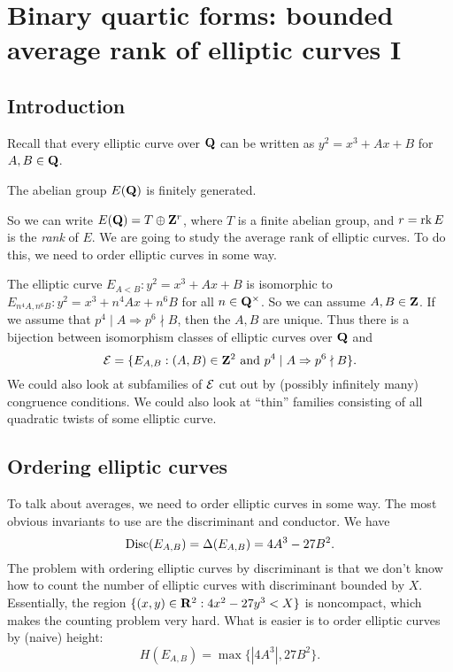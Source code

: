 
\section{Binary quartic forms: bounded average rank of elliptic curves I}\label{sec:shankar-i}





\subsection{Introduction}

Recall that every elliptic curve over $\mathbf{Q}$ can be written as 
$y^2=x^3+A x+B$ for $A,B\in \mathbf{Q}$. 

\begin{theo}[Mordell]
The abelian group $E(\mathbf{Q})$ is finitely generated. 
\end{theo}

So we can write $E(\mathbf{Q})=T\oplus \mathbf{Z}^r$, where $T$ is a finite abelian group, 
and $r=\operatorname{rk} E$ is the \emph{rank} of $E$. We are going to study the average 
rank of elliptic curves. To do this, we need to order elliptic curves in some 
way. 

The elliptic curve $E_{A<B}:y^2=x^3+A x+B$ is isomorphic to 
$E_{n^4 A,n^6 B}:y^2=x^3+n^4 A x+n^6 B$ for all $n\in \mathbf{Q}^\times$. So we can 
assume $A,B\in \mathbf{Z}$. If we assume that $p^4\mid A\Rightarrow p^6\nmid B$, then 
the $A,B$ are unique. Thus there is a bijection between isomorphism classes of 
elliptic curves over $\mathbf{Q}$ and 
\[
  \mathcal{E} = \{E_{A,B}:(A,B)\in \mathbf{Z}^2\text{ and }p^4\mid A\Rightarrow p^6\nmid B\} .
\]
We could also look at subfamilies of $\mathcal{E}$ cut out by (possibly infinitely 
many) congruence conditions. We could also look at ``thin'' families consisting 
of all quadratic twists of some elliptic curve. 





\subsection{Ordering elliptic curves}

To talk about averages, we need to order elliptic curves in some way. The most 
obvious invariants to use are the discriminant and conductor. We have 
\[
  \operatorname{Disc}(E_{A,B}) = \Delta(E_{A,B}) = 4 A^3 - 27 B^2 .
\]
The problem with ordering elliptic curves by discriminant is that we don't know 
how to count the number of elliptic curves with discriminant bounded by $X$. 
Essentially, the region $\{(x,y)\in \mathbf{R}^2:4 x^2 - 27 y^3<X\}$ is noncompact, 
which makes the counting problem very hard. What is easier is to order elliptic 
curves by (naive) height: 
\[
  H(E_{A,B}) = \max\{|4 A^3|, 27 B^2\} .
\]

